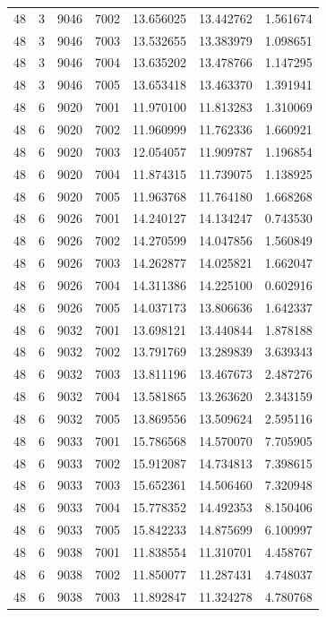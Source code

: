 \begin{table}
\begin{tabular}{rrrrrrr}
48 & 3 & 9046 & 7002 & 13.656025 & 13.442762 & 1.561674 \\
48 & 3 & 9046 & 7003 & 13.532655 & 13.383979 & 1.098651 \\
48 & 3 & 9046 & 7004 & 13.635202 & 13.478766 & 1.147295 \\
48 & 3 & 9046 & 7005 & 13.653418 & 13.463370 & 1.391941 \\
48 & 6 & 9020 & 7001 & 11.970100 & 11.813283 & 1.310069 \\
48 & 6 & 9020 & 7002 & 11.960999 & 11.762336 & 1.660921 \\
48 & 6 & 9020 & 7003 & 12.054057 & 11.909787 & 1.196854 \\
48 & 6 & 9020 & 7004 & 11.874315 & 11.739075 & 1.138925 \\
48 & 6 & 9020 & 7005 & 11.963768 & 11.764180 & 1.668268 \\
48 & 6 & 9026 & 7001 & 14.240127 & 14.134247 & 0.743530 \\
48 & 6 & 9026 & 7002 & 14.270599 & 14.047856 & 1.560849 \\
48 & 6 & 9026 & 7003 & 14.262877 & 14.025821 & 1.662047 \\
48 & 6 & 9026 & 7004 & 14.311386 & 14.225100 & 0.602916 \\
48 & 6 & 9026 & 7005 & 14.037173 & 13.806636 & 1.642337 \\
48 & 6 & 9032 & 7001 & 13.698121 & 13.440844 & 1.878188 \\
48 & 6 & 9032 & 7002 & 13.791769 & 13.289839 & 3.639343 \\
48 & 6 & 9032 & 7003 & 13.811196 & 13.467673 & 2.487276 \\
48 & 6 & 9032 & 7004 & 13.581865 & 13.263620 & 2.343159 \\
48 & 6 & 9032 & 7005 & 13.869556 & 13.509624 & 2.595116 \\
48 & 6 & 9033 & 7001 & 15.786568 & 14.570070 & 7.705905 \\
48 & 6 & 9033 & 7002 & 15.912087 & 14.734813 & 7.398615 \\
48 & 6 & 9033 & 7003 & 15.652361 & 14.506460 & 7.320948 \\
48 & 6 & 9033 & 7004 & 15.778352 & 14.492353 & 8.150406 \\
48 & 6 & 9033 & 7005 & 15.842233 & 14.875699 & 6.100997 \\
48 & 6 & 9038 & 7001 & 11.838554 & 11.310701 & 4.458767 \\
48 & 6 & 9038 & 7002 & 11.850077 & 11.287431 & 4.748037 \\
48 & 6 & 9038 & 7003 & 11.892847 & 11.324278 & 4.780768 \\

\end{tabular}
\end{table}
